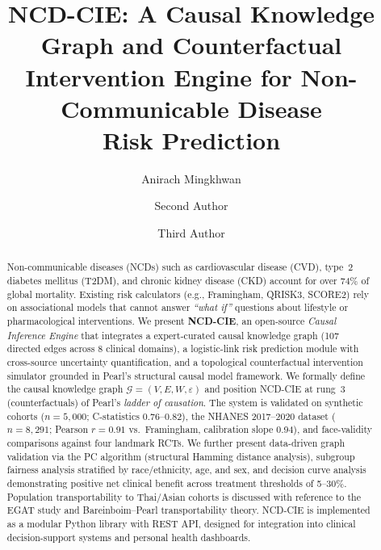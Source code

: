 \documentclass[runningheads]{llncs}
\begin{document}
\title{NCD-CIE: A Causal Knowledge Graph and Counterfactual\\Intervention Engine for Non-Communicable Disease\\Risk Prediction}

\author{Anirach Mingkhwan \and
Second Author \and
Third Author}



\maketitle

\begin{abstract}
Non-communicable diseases (NCDs) such as cardiovascular disease (CVD),
type~2 diabetes mellitus (T2DM), and chronic kidney disease (CKD)
account for over 74\% of global mortality.  Existing risk calculators
(e.g., Framingham, QRISK3, SCORE2) rely on associational models that
cannot answer \emph{``what if''} questions about lifestyle or
pharmacological interventions.  We present \textbf{NCD-CIE}, an
open-source \emph{Causal Inference Engine} that integrates a
expert-curated causal knowledge graph (107 directed edges across 8
clinical domains), a logistic-link risk prediction module with
cross-source uncertainty quantification, and a topological
counterfactual intervention simulator grounded in Pearl's structural
causal model framework.  We formally define the causal knowledge graph
$\mathcal{G}=(V,E,W,\varepsilon)$ and position NCD-CIE at rung~3
(counterfactuals) of Pearl's \emph{ladder of causation}.  The system
is validated on synthetic cohorts ($n=5{,}000$; C-statistics
0.76--0.82), the NHANES 2017--2020 dataset ($n=8{,}291$; Pearson
$r=0.91$ vs.\ Framingham, calibration slope 0.94), and face-validity
comparisons against four landmark RCTs.  We further present
data-driven graph validation via the PC algorithm (structural Hamming
distance analysis), subgroup fairness analysis stratified by
race/ethnicity, age, and sex, and decision curve analysis
demonstrating positive net clinical benefit across treatment
thresholds of 5--30\%.  Population transportability to Thai/Asian
cohorts is discussed with reference to the EGAT study and
Bareinboim--Pearl transportability theory.  NCD-CIE is implemented as
a modular Python library with REST API, designed for integration into
clinical decision-support systems and personal health dashboards.

\end{abstract}
\end{document}
